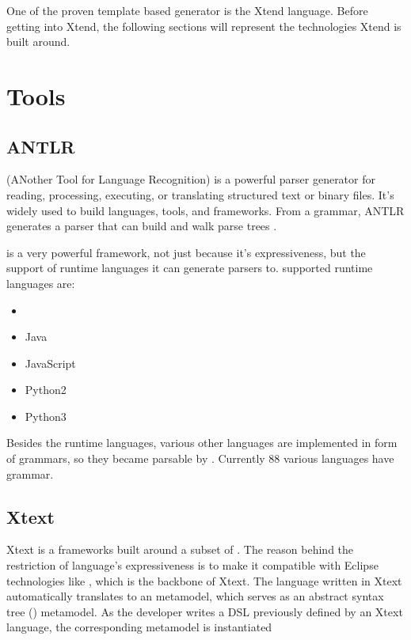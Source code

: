 One of the proven template based generator is the Xtend language. Before getting into Xtend, the following sections will represent the technologies Xtend is built around.

\section{Tools}

\subsection{ANTLR}

 (ANother Tool for Language Recognition) is a powerful parser generator for reading, processing, executing, or translating structured text or binary files. It's widely used to build languages, tools, and frameworks. From a grammar, ANTLR generates a parser that can build and walk parse trees \citep{ANTLR}.

 is a very powerful framework, not just because it's expressiveness, but the support of runtime languages it can generate parsers to.  supported runtime languages are:
\begin{itemize}
	\item {}
	\item Java
	\item JavaScript
	\item Python2
	\item Python3
\end{itemize}

Besides the runtime languages, various other languages are implemented in form of grammars, so they became parsable by . Currently 88 various languages have  grammar.

\subsection{Xtext}

Xtext is a frameworks built around a subset of . The reason behind the restriction of  language's expressiveness  is to make it compatible with Eclipse technologies like \emf{}, which is the backbone of Xtext. The language written in Xtext automatically translates to an \emf{} metamodel, which serves as an abstract syntax tree () metamodel. As the developer writes a DSL previously defined by an Xtext language, the corresponding \emf{} metamodel is instantiated

